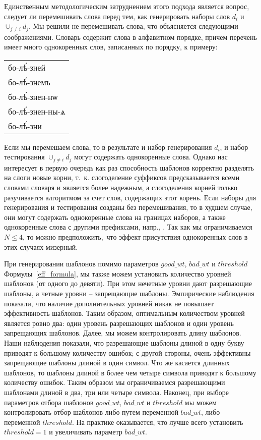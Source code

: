 \documentclass[12pt,a4paper,oneside]{extarticle}
\begin{document}
Единственным методологическим затруднением этого подхода является вопрос, следует ли перемешивать слова перед тем, как генерировать наборы слов $d_i$ и $\cup_{j \neq i} d_j$. Мы решили не перемешивать слова, что объясняется следующими соображениями. Словарь содержит слова в алфавитном порядке, причем перечень имеет много однокоренных слов, записанных по порядку, к примеру:

\begin{center}
\begin{churchslavonic}
\begin{tabular}{l}
бо-лѣ́-зней \\
бо-лѣ́-знемъ \\
бо-лѣ́-знен-нѡ \\
бо-лѣ́-знен-ны-ѧ \\
бо-лѣ́-зни \\
\end{tabular}
\end{churchslavonic}
\end{center}

\noindent Если мы перемешаем слова, то в результате и набор генерирования $d_i$, и набор тестирования $\cup_{j \neq i} d_j$ могут содержать однокоренные слова. Однако нас интересует в первую очередь как раз способность шаблонов корректно разделять на слоги новые корни, т.~к. слогоделение суффиксов предсказывается всеми словами словаря и является более надежным, а слогоделения корней только разучивается алгоритмом за счет слов, содержащих этот корень. Если наборы для генерирования и тестирования созданы без перемешивания, то в худшем случае, они могут содержать однокоренные слова на границах наборов, а также однокоренные слова с другими префиксами, напр., . Так как мы ограничиваемся $N \leq 4$, то можно предположить, что эффект присутствия однокоренных слов в этих случаях мизерный.

При генерировании шаблонов помимо параметров $good\_wt$, $bad\_wt$ и $threshold$ Формулы~\ref{eff_formula}, мы также можем установить количество уровней шаблонов (от одного до девяти). При этом нечетные уровни дают разрешающие шаблоны, а четные уровни -- запрещающие шаблоны. Эмпирические наблюдения показали, что наличие дополнительных уровней никак не повышает эффективность шаблонов. Таким образом, оптимальным количеством уровней является ровно два: один уровень разрешающих шаблонов и один уровень запрещающих шаблонов. Далее, мы можем контролировать длину шаблонов. Наши наблюдения показали, что разрешающие шаблоны длиной в одну букву приводят к большому количеству ошибок; с другой стороны, очень эффективны запрещающие шаблоны длиной в один символ. Что же касается длинных шаблонов, то шаблоны длиной в более чем четыре символа приводят к большому количеству ошибок. Таким образом мы ограничиваемся разрешающими шаблонами длиной в два, три или четыре символа. Наконец, при выборе параметров отбора шаблонов $good\_wt$, $bad\_wt$ и $threshold$ мы можем контролировать отбор шаблонов либо путем переменной $bad\_wt$, либо переменной $threshold$. На практике оказывается, что лучше всего установить $threshold = 1$ и увеличивать параметр $bad\_wt$.
\end{document}
